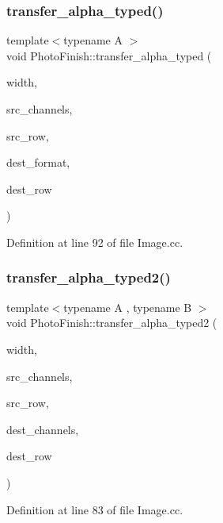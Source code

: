 \subsubsection{\texorpdfstring{transfer\+\_\+alpha\+\_\+typed()}{transfer\_alpha\_typed()}}
{\footnotesize\ttfamily template$<$typename A $>$ \\
void Photo\+Finish\+::transfer\+\_\+alpha\+\_\+typed (\begin{DoxyParamCaption}\item[{unsigned int}]{width,  }\item[{unsigned char}]{src\+\_\+channels,  }\item[{const A $\ast$}]{src\+\_\+row,  }\item[{\hyperlink{class_c_m_s_1_1_format}{C\+M\+S\+::\+Format}}]{dest\+\_\+format,  }\item[{const unsigned char $\ast$}]{dest\+\_\+row }\end{DoxyParamCaption})}



Definition at line 92 of file Image.\+cc.

\mbox{\label{namespace_photo_finish_ace71473b76f98f3b7b124f13e4b0a52a}} 
\subsubsection{\texorpdfstring{transfer\+\_\+alpha\+\_\+typed2()}{transfer\_alpha\_typed2()}}
{\footnotesize\ttfamily template$<$typename A , typename B $>$ \\
void Photo\+Finish\+::transfer\+\_\+alpha\+\_\+typed2 (\begin{DoxyParamCaption}\item[{unsigned int}]{width,  }\item[{unsigned char}]{src\+\_\+channels,  }\item[{const A $\ast$}]{src\+\_\+row,  }\item[{unsigned char}]{dest\+\_\+channels,  }\item[{const B $\ast$}]{dest\+\_\+row }\end{DoxyParamCaption})}



Definition at line 83 of file Image.\+cc.

